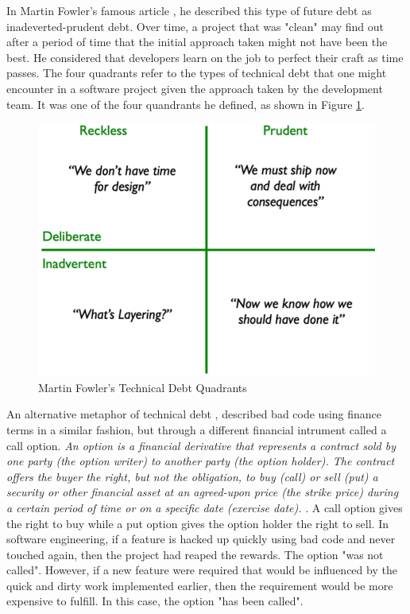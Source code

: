 \documentclass{mprop}
\begin{document}
In Martin Fowler's famous article \cite{TDMartin}, he described this type of future debt as inadeverted-prudent debt.
Over time, a project that was "clean" may find out after a period of time that the initial approach taken might not have been the best.
He considered that developers learn on the job to perfect their craft as time passes.
The four quadrants refer to the types of technical debt that one might encounter in a software project given the approach taken by the development team.
It was one of the four quandrants he defined, as shown in Figure \ref{fig:td-quandrants}.

\begin{figure}
	\centering
	\includegraphics[width=0.5\linewidth]{visualisations/TD_quadrants.png}
	\caption{Martin Fowler's Technical Debt Quadrants}
	\label{fig:td-quandrants}
\end{figure}


An alternative metaphor of technical debt \cite{UnhedgedCallOption}, described bad code using finance terms in a similar fashion, but through a different financial intrument called a call option.
\textit{An option is a financial derivative that represents a contract sold by one party (the option writer) to another party (the option holder). The contract offers the buyer the right, but not the obligation, to buy (call) or sell (put) a security or other financial asset at an agreed-upon price (the strike price) during a certain period of time or on a specific date (exercise date).} \cite{option-investopedia}.
A call option gives the right to buy while a put option gives the option holder the right to sell.
In software engineering, if a feature is hacked up quickly using bad code and never touched again, then the project had reaped the rewards.
The option "was not called".
However, if a new feature were required that would be influenced by the quick and dirty work implemented earlier, then the requirement would be more expensive to fulfill.
In this case, the option "has been called".
\end{document}
